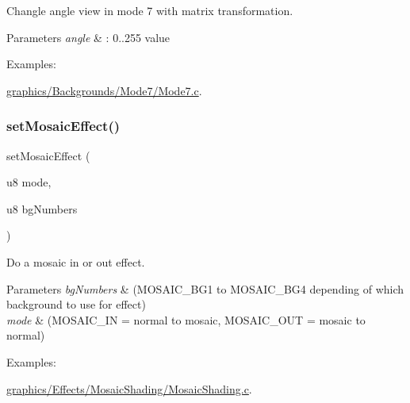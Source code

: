 Changle angle view in mode 7 with matrix transformation. 


\begin{DoxyParams}{Parameters}
{\em angle} & \+: 0..255 value \\
\hline
\end{DoxyParams}
\begin{Desc}
\item[Examples\+: ]\par
\hyperlink{a00465}{graphics/\+Backgrounds/\+Mode7/\+Mode7.\+c}.\end{Desc}
\mbox{\label{a00416_aa14785c4eb1ce08cc02eb98d26c98c44}} 
\subsubsection{\texorpdfstring{set\+Mosaic\+Effect()}{setMosaicEffect()}}
{\footnotesize\ttfamily set\+Mosaic\+Effect (\begin{DoxyParamCaption}\item[{u8}]{mode,  }\item[{u8}]{bg\+Numbers }\end{DoxyParamCaption})}



Do a mosaic in or out effect. 


\begin{DoxyParams}{Parameters}
{\em bg\+Numbers} & (M\+O\+S\+A\+I\+C\+\_\+\+B\+G1 to M\+O\+S\+A\+I\+C\+\_\+\+B\+G4 depending of which background to use for effect) \\
\hline
{\em mode} & (M\+O\+S\+A\+I\+C\+\_\+\+IN = normal to mosaic, M\+O\+S\+A\+I\+C\+\_\+\+O\+UT = mosaic to normal) \\
\hline
\end{DoxyParams}
\begin{Desc}
\item[Examples\+: ]\par
\hyperlink{a00469}{graphics/\+Effects/\+Mosaic\+Shading/\+Mosaic\+Shading.\+c}.\end{Desc}
